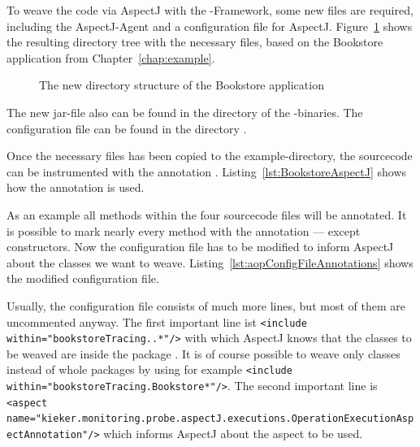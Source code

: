 To weave the code via AspectJ with the \Kieker{}-Framework,
some new files are required, including the AspectJ-Agent and a configuration
file for AspectJ. Figure~\ref{fig:bookstoreAOP:dirStructure} shows the resulting %
directory tree with the necessary files, based on the Bookstore application from %
Chapter~\ref{chap:example}.

\begin{figure}[H]
\begin{graybox}
\end{graybox}

\caption{The new directory structure of the Bookstore application}
\label{fig:bookstoreAOP:dirStructure}
\end{figure}

\noindent The new jar-file  also can be found
in the  directory of the \Kieker{}-binaries. The
configuration file \file{\aopConfigFile} can be found in the directory .

Once the necessary files has been copied to the example-directory,
the sourcecode can be instrumented with the annotation .
Listing~\ref{lst:BookstoreAspectJ} shows how the annotation is
used.

\setJavaCodeListing


As an example all methods within the four sourcecode files will be
annotated. It is possible to mark nearly every method with the annotation
--- except constructors. Now the configuration file has to be modified to inform AspectJ about the classes we want to weave. Listing~\ref{lst:aopConfigFileAnnotations} shows the modified configuration file.
\setXMLListing

Usually, the configuration file consists of much more lines, but most of them are uncommented anyway. The first important line ist 
\lstinline$<include within="bookstoreTracing..*"/>$
with which AspectJ knows that the classes to be weaved are inside the package . It is of course possible to weave only classes instead of whole packages by using for example 
\lstinline$<include within="bookstoreTracing.Bookstore*"/>$. The second important line is 
\lstinline$<aspect name="kieker.monitoring.probe.aspectJ.executions.OperationExecutionAspectAnnotation"/>$ which informs AspectJ about the aspect to be used.

